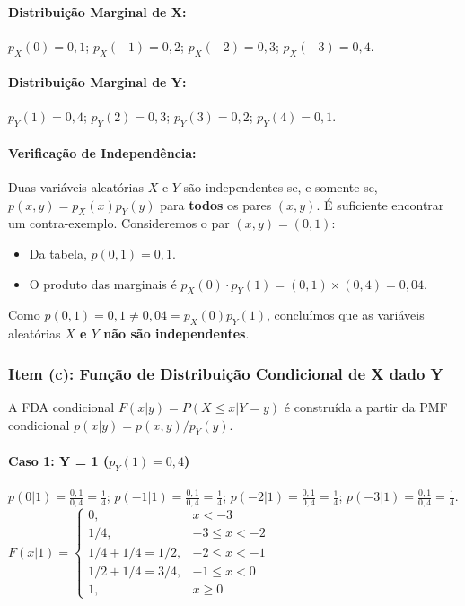 \documentclass[
]{article}
\begin{document}
\paragraph{Distribuição Marginal de X:}

\(p_X(0) = 0,1\); \quad \(p_X(-1) = 0,2\); \quad \(p_X(-2) = 0,3\);
\quad \(p_X(-3) = 0,4\).

\paragraph{Distribuição Marginal de Y:}

\(p_Y(1) = 0,4\); \quad \(p_Y(2) = 0,3\); \quad \(p_Y(3) = 0,2\);
\quad \(p_Y(4) = 0,1\).

\paragraph{Verificação de Independência:}

Duas variáveis aleatórias \(X\) e \(Y\) são independentes se, e somente
se, \(p(x,y) = p_X(x)p_Y(y)\) para \textbf{todos} os pares \((x,y)\). É
suficiente encontrar um contra-exemplo. Consideremos o par
\((x,y) = (0,1)\):

\begin{itemize}
    \item Da tabela, $p(0,1) = 0,1$.
    \item O produto das marginais é $p_X(0) \cdot p_Y(1) = (0,1) \times (0,4) = 0,04$.
\end{itemize}

Como \(p(0,1) = 0,1 \neq 0,04 = p_X(0)p_Y(1)\), concluímos que as
variáveis aleatórias \textbf{$X$ e $Y$ não são independentes}.

\subsubsection*{Item (c): Função de Distribuição Condicional de X dado Y}

A FDA condicional \(F(x|y) = P(X \le x | Y=y)\) é construída a partir da
PMF condicional \(p(x|y) = p(x,y)/p_Y(y)\).

\paragraph{Caso 1: Y = 1 ($p_Y(1)=0,4$)}

\(p(0|1) = \frac{0,1}{0,4} = \frac{1}{4}\);
\(p(-1|1) = \frac{0,1}{0,4} = \frac{1}{4}\);
\(p(-2|1) = \frac{0,1}{0,4} = \frac{1}{4}\);
\(p(-3|1) = \frac{0,1}{0,4} = \frac{1}{4}\). \(F(x|1) = \begin{cases}
0, & x < -3 \\ 1/4, & -3 \le x < -2 \\ 1/4+1/4 = 1/2, & -2 \le x < -1 \\ 1/2+1/4 = 3/4, & -1 \le x < 0 \\ 1, & x \ge 0
\end{cases}\)
\end{document}
